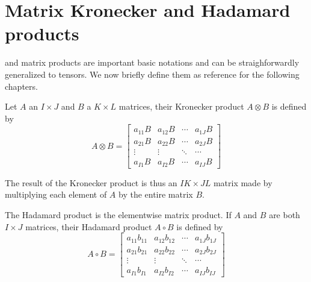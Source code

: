 \section{Matrix Kronecker and Hadamard products}
 and  matrix products are important basic notations and can be straighforwardly generalized to tensors. We now briefly define them as reference for the following chapters.
\begin{Def}
  Let $A$ an $I \times J$ and $B$ a $K \times L$ matrices, their Kronecker product $A \otimes B$ is defined by
  \begin{equation} \label{def:kronecker}
    A \otimes B =
    \begin{bmatrix}
      a_{11}B & a_{12}B & \cdots & a_{1J}B \\
      a_{21}B & a_{22}B & \cdots & a_{2J}B \\
      \vdots & \vdots & \ddots & \cdots \\
      a_{I1}B & a_{I2}B & \cdots & a_{IJ}B
    \end{bmatrix}
  \end{equation}
\end{Def}
The result of the Kronecker product is thus an $IK \times JL$ matrix made by multiplying each element of $A$ by the entire matrix $B$.

\begin{Def}
  The Hadamard product is the elementwise matrix product. If $A$ and $B$ are both $I \times J$ matrices, their Hadamard product $A \circ B$ is defined by
  \begin{equation} \label{def:hadamard}
    A \circ B =
    \begin{bmatrix}
      a_{11}b_{11} & a_{12}b_{12} & \cdots & a_{1J}b_{1J} \\
      a_{21}b_{21} & a_{22}b_{22} & \cdots & a_{2J}b_{2J} \\
      \vdots & \vdots & \ddots & \cdots \\
      a_{I1}b_{I1} & a_{I2}b_{I2} & \cdots & a_{IJ}b_{IJ}
    \end{bmatrix}
  \end{equation}
\end{Def}

